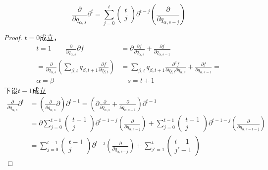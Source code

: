 \documentclass[12pt, a4paper, oneside, UTF8]{ctexbook}  %
\newcommand{\pa}{\partial}
\begin{document}
\begin{lemma}
    \[
\frac{\partial}{\partial q_{\alpha,s}}\pa^t=
\sum_{j=0}^{t}
\begin{pmatrix}
t\\
j
\end{pmatrix}
\pa^{t-j}
\left(\frac{\partial}{\partial q_{\alpha,s-j}}\right)
\]
\begin{proof}
    \(t=0\)成立，
    \begin{align*}
        t=1\qquad
        \frac{\partial}{\partial q_{\alpha,s}}\pa f
        &=\pa \frac{\partial f}{\partial q_{\alpha,s}}
        +\frac{\pa f}{\pa q_{\alpha,s-1}}\\
        =\frac{\partial}{\partial q_{\alpha,s}}
        \left(\sum_{\beta,t}q_{\beta,t+1}\frac{\pa f}{\pa q_{\beta,t}}\right)
        &=\sum_{\beta,t}q_{\beta,t+1}\frac{\pa^2 f}{\pa q_{\beta,t} \pa q_{\alpha,s}}
        +\frac{\pa f}{\pa q_{\alpha,s-1}}=\\
        \alpha=\beta\quad&\quad s=t+1
    \end{align*}
    下设\(t-1\)成立
    \begin{align*}
        \frac{\partial}{\partial q_{\alpha,s}}\pa^t
        &=\left(\frac{\partial}{\partial q_{\alpha,s}}\pa \right)\pa^{t-1}
        =\left(\pa \frac{\partial }{\partial q_{\alpha,s}}
        +\frac{\pa }{\pa q_{\alpha,s-1}}\right)\pa ^{t-1}\\
        &=\pa \sum_{j=0}^{t-1}
        \begin{pmatrix}
        t-1\\
        j
        \end{pmatrix}
        \pa^{t-1-j}
        \left(\frac{\partial}{\partial q_{\alpha,s-j}}\right)
        +\sum_{j=0}^{t-1}
        \begin{pmatrix}
        t-1\\
        j
        \end{pmatrix}
        \pa^{t-1-j}
        \left(\frac{\partial}{\partial q_{\alpha,s-1-j}}\right)\\
        &=\sum_{j=0}^{t-1}
        \begin{pmatrix}
        t-1\\
        j
        \end{pmatrix}
        \pa^{t-j}
        \left(\frac{\partial}{\partial q_{\alpha,s-j}}\right)
        +\sum_{j'=1}^{t}
        \begin{pmatrix}
        t-1\\
        j'-1
        \end{pmatrix}

\end{align*}
\end{proof}
\end{lemma}
\end{document}
